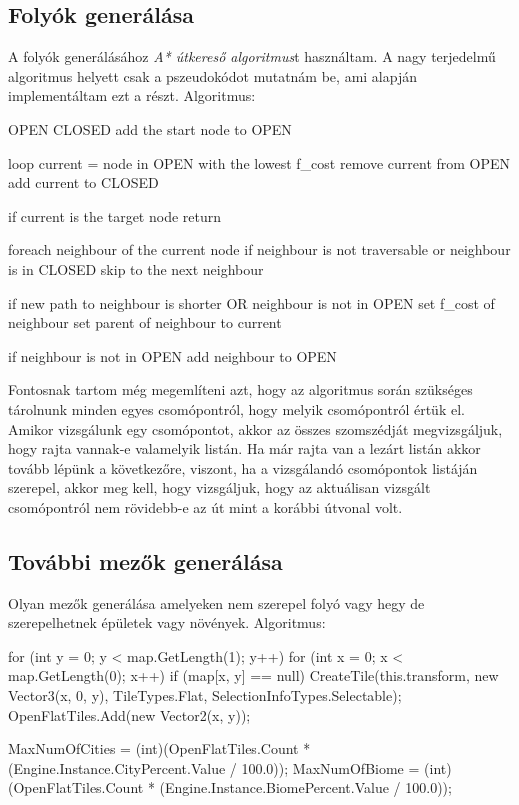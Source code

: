 \subsection{Folyók generálása}

A folyók generálásához \textit{A* útkereső algoritmus}t használtam. A nagy terjedelmű algoritmus helyett csak a pszeudokódot mutatnám be, ami alapján implementáltam ezt a részt.
\newline
\newline Algoritmus:

\begin{cpp}
OPEN 
CLOSED 
add the start node to OPEN

loop
   current = node in OPEN  with the lowest f_cost
   remove current from OPEN
   add current to CLOSED

   if current is the target node
      return

   foreach neighbour of the current node
      if neighbour is not traversable or neighbour is in CLOSED
         skip to the next neighbour

      if new path to neighbour is shorter OR neighbour is not in OPEN
         set f_cost of neighbour
         set parent of neighbour to current
         
         if neighbour is not in OPEN
            add neighbour to OPEN
\end{cpp}

\noindent Fontosnak tartom még megemlíteni azt, hogy az algoritmus során szükséges tárolnunk minden egyes csomópontról, hogy melyik csomópontról értük el. Amikor vizsgálunk egy csomópontot, akkor az összes szomszédját megvizsgáljuk, hogy rajta vannak-e valamelyik listán. Ha már rajta van a lezárt listán akkor tovább lépünk a következőre, viszont, ha a vizsgálandó csomópontok listáján szerepel, akkor meg kell, hogy vizsgáljuk, hogy az aktuálisan vizsgált csomópontról nem rövidebb-e az út mint a korábbi útvonal volt.

\subsection{További mezők generálása}

Olyan mezők generálása amelyeken nem szerepel folyó vagy hegy de szerepelhetnek épületek vagy növények.
\newline
\newline Algoritmus:   

\begin{cpp}
for (int y = 0; y < map.GetLength(1); y++)
{
   for (int x = 0; x < map.GetLength(0); x++)
   {
      if (map[x, y] == null)
      {
         CreateTile(this.transform, new Vector3(x, 0, y),
         TileTypes.Flat, SelectionInfoTypes.Selectable);
         OpenFlatTiles.Add(new Vector2(x, y));
      }
   }
}

MaxNumOfCities = (int)(OpenFlatTiles.Count * 
(Engine.Instance.CityPercent.Value / 100.0));
MaxNumOfBiome = (int)(OpenFlatTiles.Count * 
(Engine.Instance.BiomePercent.Value / 100.0));
\end{cpp}

